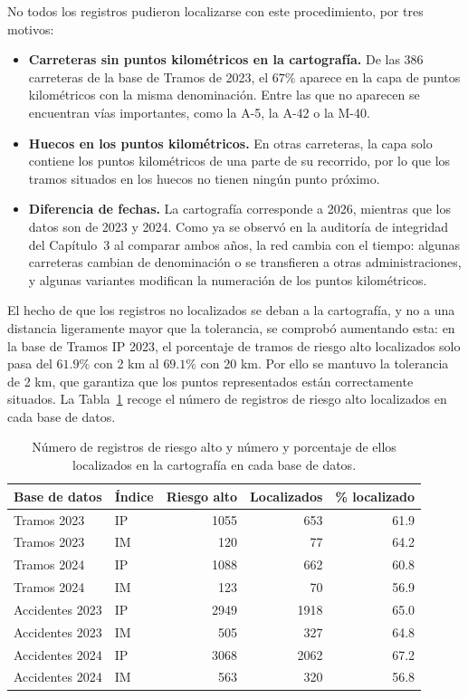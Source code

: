 \documentclass[twoside,a4paper,12pt,onecolumn,openany]{book}
\begin{document}
No todos los registros pudieron localizarse con este procedimiento, por tres motivos:
 
\begin{itemize}
    \item \textbf{Carreteras sin puntos kilométricos en la cartografía.} De las 386 carreteras de la base de Tramos de 2023, el $67\%$ aparece en la capa de puntos kilométricos con la misma denominación. Entre las que no aparecen se encuentran vías importantes, como la A-5, la A-42 o la M-40.
    \item \textbf{Huecos en los puntos kilométricos.} En otras carreteras, la capa solo contiene los puntos kilométricos de una parte de su recorrido, por lo que los tramos situados en los huecos no tienen ningún punto próximo.
    \item \textbf{Diferencia de fechas.} La cartografía corresponde a 2026, mientras que los datos son de 2023 y 2024. Como ya se observó en la auditoría de integridad del Capítulo~3 al comparar ambos años, la red cambia con el tiempo: algunas carreteras cambian de denominación o se transfieren a otras administraciones, y algunas variantes modifican la numeración de los puntos kilométricos.
\end{itemize}
 
El hecho de que los registros no localizados se deban a la cartografía, y no a una distancia ligeramente mayor que la tolerancia, se comprobó aumentando esta: en la base de Tramos IP 2023, el porcentaje de tramos de riesgo alto localizados solo pasa del $61.9\%$ con 2 km al $69.1\%$ con 20 km. Por ello se mantuvo la tolerancia de 2 km, que garantiza que los puntos representados están correctamente situados. La Tabla~\ref{tab:localizacion_mapas} recoge el número de registros de riesgo alto localizados en cada base de datos.
 
\begin{table}[H]
\centering
\small
\begin{tabular}{llrrr}
\toprule
\textbf{Base de datos} & \textbf{Índice} & \textbf{Riesgo alto} & \textbf{Localizados} & \textbf{\% localizado} \\
\midrule
Tramos 2023     & IP & 1055 & 653  & 61.9 \\
Tramos 2023     & IM & 120  & 77   & 64.2 \\
Tramos 2024     & IP & 1088 & 662  & 60.8 \\
Tramos 2024     & IM & 123  & 70   & 56.9 \\
\midrule
Accidentes 2023 & IP & 2949 & 1918 & 65.0 \\
Accidentes 2023 & IM & 505  & 327  & 64.8 \\
Accidentes 2024 & IP & 3068 & 2062 & 67.2 \\
Accidentes 2024 & IM & 563  & 320  & 56.8 \\
\bottomrule
\end{tabular}
\caption{Número de registros de riesgo alto y número y porcentaje de ellos localizados en la cartografía en cada base de datos.}
\label{tab:localizacion_mapas}
\end{table}
 
\end{document}

